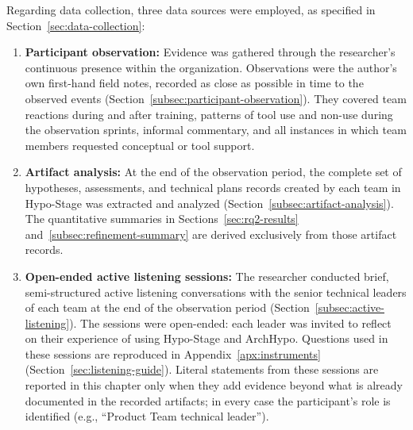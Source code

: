 Regarding data collection, three data sources were employed, as specified in Section~\ref{sec:data-collection}:
\begin{enumerate}
  \item \textbf{Participant observation:} Evidence was gathered through the
    researcher's continuous presence within the organization. Observations
    were the author's own first-hand field notes, recorded as close as
    possible in time to the observed events (Section~\ref{subsec:participant-observation}). They covered
    team reactions during and after training, patterns of tool use and
    non-use during the observation sprints, informal commentary, and all
    instances in which team members requested conceptual or tool support.
  \item \textbf{Artifact analysis:} At the end of the observation period, the
    complete set of hypotheses, assessments, and technical plans records created by each team in Hypo-Stage was extracted and analyzed
    (Section~\ref{subsec:artifact-analysis}). The quantitative summaries in Sections~\ref{sec:rq2-results} and~\ref{subsec:refinement-summary} 
    are derived exclusively from those artifact records.
  \item \textbf{Open-ended active listening sessions:} The researcher
    conducted brief, semi-structured active listening conversations with the
    senior technical leaders of each team at the end of the observation period
    (Section~\ref{subsec:active-listening}). The sessions were open-ended: each leader was invited to
    reflect on their experience of using Hypo-Stage and ArchHypo. Questions
    used in these sessions are reproduced in Appendix~\ref{apx:instruments}
    (Section~\ref{sec:listening-guide}). Literal statements from these
    sessions are reported in this chapter only when they add evidence beyond
    what is already documented in the recorded artifacts; in every case the
    participant's role is identified (e.g., ``Product Team technical leader'').
\end{enumerate}

